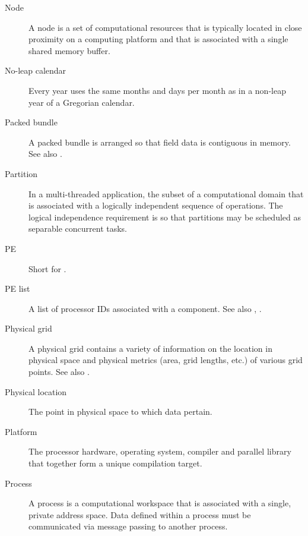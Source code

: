 \begin{description}
\item[Node] \label{glos:Node} A node is a set of computational resources
  that is typically located in close proximity on a computing platform
  and that is associated with a single shared memory buffer.

\item [No-leap calendar] \label{glos:NoLeap} Every year uses the same months 
  and days per month as in a non-leap year of a Gregorian calendar.

\item[Packed bundle] \label{glos:PackedBundle} A packed bundle is arranged
  so that field data is contiguous in memory. See also .

\item[Partition] \label{glos:Partition} In a multi-threaded application, the subset of a
  computational domain that is associated with a logically independent
  sequence of operations. The logical independence requirement is so
  that partitions may be scheduled as separable concurrent tasks.

\item[PE] \label{glos:PE} Short for .

\item[PE list] \label{glos:PEList} A list of processor IDs associated 
  with a component.  See also , .

\item[Physical grid] \label{term:PhysGrid} 
  A physical grid contains a variety of information on the location 
  in physical space and physical metrics (area, grid lengths, etc.) 
  of various grid points. See also . 

\item[Physical location] \label{glos:PhysLoc} The point in physical space 
  to which data pertain. 

\item[Platform] \label{glos:Platform} 
  The processor hardware, operating system, compiler and
  parallel library that together form a unique compilation target.

\item[Process] \label{glos:Process}
  A process is a computational workspace that is associated with a single,
  private address space. Data defined within a process must be communicated
  via message passing to another process.


\end{description}
